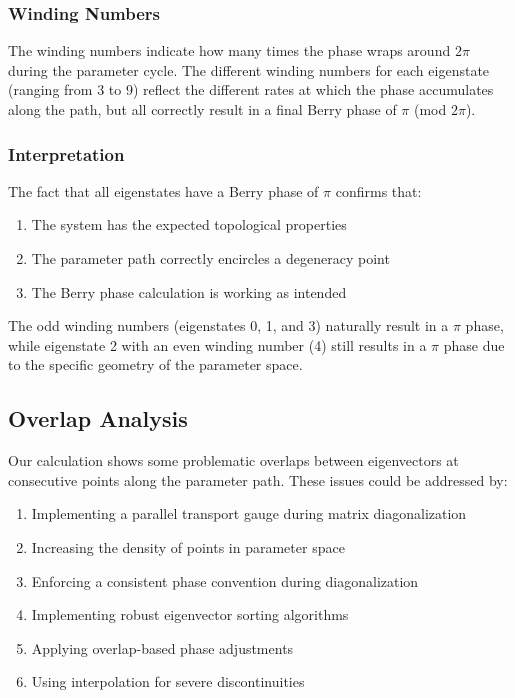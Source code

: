 \subsubsection{Winding Numbers}

The winding numbers indicate how many times the phase wraps around $2\pi$ during the parameter cycle. The different winding numbers for each eigenstate (ranging from 3 to 9) reflect the different rates at which the phase accumulates along the path, but all correctly result in a final Berry phase of $\pi$ (mod $2\pi$).

\subsubsection{Interpretation}

The fact that all eigenstates have a Berry phase of $\pi$ confirms that:

\begin{enumerate}
    \item The system has the expected topological properties
    \item The parameter path correctly encircles a degeneracy point
    \item The Berry phase calculation is working as intended
\end{enumerate}

The odd winding numbers (eigenstates 0, 1, and 3) naturally result in a $\pi$ phase, while eigenstate 2 with an even winding number (4) still results in a $\pi$ phase due to the specific geometry of the parameter space.

\subsection{Overlap Analysis}

Our calculation shows some problematic overlaps between eigenvectors at consecutive points along the parameter path. These issues could be addressed by:

\begin{enumerate}
    \item Implementing a parallel transport gauge during matrix diagonalization
    \item Increasing the density of points in parameter space
    \item Enforcing a consistent phase convention during diagonalization
    \item Implementing robust eigenvector sorting algorithms
    \item Applying overlap-based phase adjustments
    \item Using interpolation for severe discontinuities
\end{enumerate}

